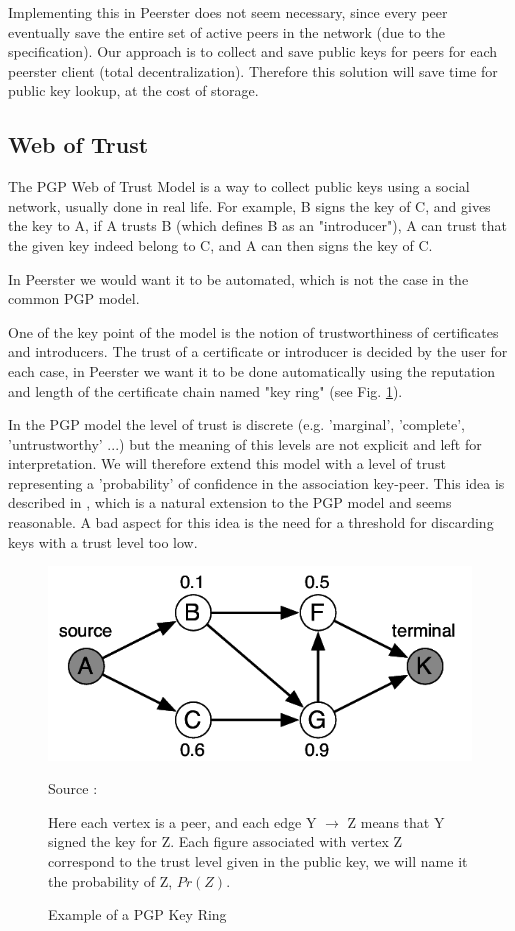 \documentclass[]{article}
\begin{document}
Implementing this in Peerster does not seem necessary, since every peer eventually save the entire set of active peers in the network (due to the specification). Our approach is to collect and save public keys for peers for each peerster client (total decentralization). Therefore this solution will save time for public key lookup, at the cost of storage.

\subsection{Web of Trust}
\label{sec:related-work-wot}
The PGP Web of Trust Model \cite{abdul1997pgp} is a way to collect public keys using a social network, usually done in real life. For example, B signs the key of C, and gives the key to A, if A trusts B (which defines B as an "introducer"), A can trust that the given key indeed belong to C, and A can then signs the key of C. 

In Peerster we would want it to be automated, which is not the case in the common PGP model. 

One of the key point of the model is the notion of trustworthiness of certificates and introducers. The trust of a certificate or introducer is decided by the user for each case, in Peerster we want it to be done automatically using the reputation and length of the certificate chain named "key ring" (see Fig. \ref{fig:pgp-key-ring}).

In the PGP model the level of trust is discrete (e.g. 'marginal', 'complete', 'untrustworthy' ...) but the meaning of this levels are not explicit and left for interpretation. We will therefore extend this model with a level of trust representing a 'probability' of confidence in the association key-peer. This idea is described in \cite{haenni2007new}, which is a natural extension to the PGP model and seems reasonable.
A bad aspect for this idea is the need for a threshold for discarding keys with a trust level too low.

\begin{figure}[h]
\includegraphics{pgp-key-ring}
\centering
\caption{Example of a PGP Key Ring}
\label{fig:pgp-key-ring}
Source : \cite{haenni2007new}

Here each vertex is a peer, and each edge Y $\rightarrow$ Z means that Y signed the key for Z.
Each figure associated with vertex Z  correspond to the trust level given in the public key, we will name it the probability of Z, $Pr(Z)$.
\end{figure}
\end{document}
